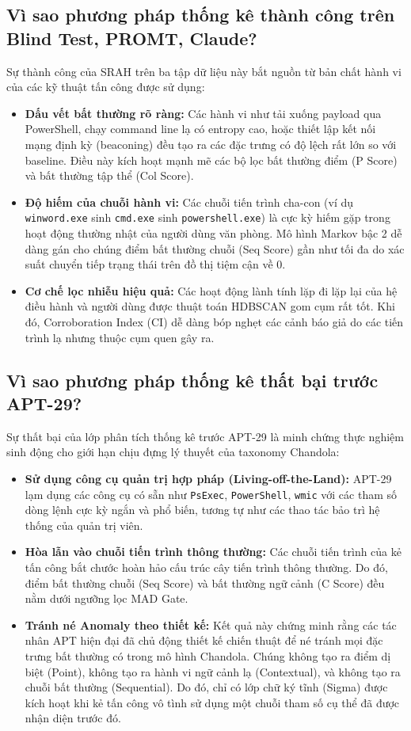 \documentclass[../main.tex]{subfiles}
\begin{document}
\subsection{Vì sao phương pháp thống kê thành công trên Blind Test, PROMT, Claude?}
Sự thành công của SRAH trên ba tập dữ liệu này bắt nguồn từ bản chất hành vi của các kỹ thuật tấn công được sử dụng:
\begin{itemize}
    \item \textbf{Dấu vết bất thường rõ ràng:} Các hành vi như tải xuống payload qua PowerShell, chạy command line lạ có entropy cao, hoặc thiết lập kết nối mạng định kỳ (beaconing) đều tạo ra các đặc trưng có độ lệch rất lớn so với baseline. Điều này kích hoạt mạnh mẽ các bộ lọc bất thường điểm (P Score) và bất thường tập thể (Col Score).
    \item \textbf{Độ hiếm của chuỗi hành vi:} Các chuỗi tiến trình cha-con (ví dụ \texttt{winword.exe} sinh \texttt{cmd.exe} sinh \texttt{powershell.exe}) là cực kỳ hiếm gặp trong hoạt động thường nhật của người dùng văn phòng. Mô hình Markov bậc 2 dễ dàng gán cho chúng điểm bất thường chuỗi (Seq Score) gần như tối đa do xác suất chuyển tiếp trạng thái trên đồ thị tiệm cận về 0.
    \item \textbf{Cơ chế lọc nhiễu hiệu quả:} Các hoạt động lành tính lặp đi lặp lại của hệ điều hành và người dùng được thuật toán HDBSCAN gom cụm rất tốt. Khi đó, Corroboration Index (CI) dễ dàng bóp nghẹt các cảnh báo giả do các tiến trình lạ nhưng thuộc cụm quen gây ra.
\end{itemize}

\subsection{Vì sao phương pháp thống kê thất bại trước APT-29?}
Sự thất bại của lớp phân tích thống kê trước APT-29 là minh chứng thực nghiệm sinh động cho giới hạn chịu đựng lý thuyết của taxonomy Chandola:
\begin{itemize}
    \item \textbf{Sử dụng công cụ quản trị hợp pháp (Living-off-the-Land):} APT-29 lạm dụng các công cụ có sẵn như \texttt{PsExec}, \texttt{PowerShell}, \texttt{wmic} với các tham số dòng lệnh cực kỳ ngắn và phổ biến, tương tự như các thao tác bảo trì hệ thống của quản trị viên.
    \item \textbf{Hòa lẫn vào chuỗi tiến trình thông thường:} Các chuỗi tiến trình của kẻ tấn công bắt chước hoàn hảo cấu trúc cây tiến trình thông thường. Do đó, điểm bất thường chuỗi (Seq Score) và bất thường ngữ cảnh (C Score) đều nằm dưới ngưỡng lọc MAD Gate.
    \item \textbf{Tránh né Anomaly theo thiết kế:} Kết quả này chứng minh rằng các tác nhân APT hiện đại đã chủ động thiết kế chiến thuật để né tránh mọi đặc trưng bất thường có trong mô hình Chandola. Chúng không tạo ra điểm dị biệt (Point), không tạo ra hành vi ngữ cảnh lạ (Contextual), và không tạo ra chuỗi bất thường (Sequential). Do đó, chỉ có lớp chữ ký tĩnh (Sigma) được kích hoạt khi kẻ tấn công vô tình sử dụng một chuỗi tham số cụ thể đã được nhận diện trước đó.
\end{itemize}
\end{document}
